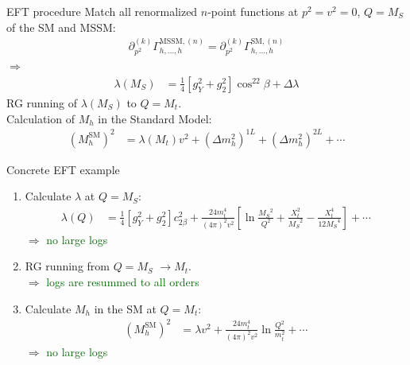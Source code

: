 \documentclass[hyperref={pdfpagelabels=false},ngerman]{beamer}
\newcommand{\MS}{\ensuremath{M_S}}
\newcommand{\SM}{\ensuremath{\text{SM}}}
\newcommand{\MSSM}{\ensuremath{\text{MSSM}}}
\begin{document}
\begin{frame}{EFT procedure}
  Match all renormalized $n$-point functions at $p^2 = v^2 = 0$, $Q =
  \MS$ of the SM and MSSM:
  \begin{align*}
    \partial_{p^2}^{(k)}\Gamma_{h,\ldots,h}^{\MSSM,(n)}
    = \partial_{p^2}^{(k)}\Gamma_{h,\ldots,h}^{\SM,(n)}
  \end{align*}
  $\Rightarrow$
  \begin{align*}
    \lambda(M_S) &= \frac{1}{4}\left[g_Y^{2} + g_2^2\right] \cos^22\beta
    + \Delta \lambda
  \end{align*}
  RG running of $\lambda(\MS)$ to $Q=M_t$.\\
  Calculation of $M_h$ in the Standard Model:
  \begin{align*}
    (M_h^\SM)^2 &= \lambda(M_t) v^2 + (\Delta m_h^2)^{1L}
    + (\Delta m_h^2)^{2L} + \cdots
  \end{align*}
\end{frame}

\begin{frame}{Concrete EFT example}
  \begin{enumerate}
  \item Calculate $\lambda$ at $Q = \MS$:
    \begin{align*}
      \lambda(Q) &= \frac{1}{4}\left[g_Y^{2} + g_2^2\right] c^2_{2\beta}
      + \frac{24 m_t^4}{(4\pi)^2 v^2} \left[
        \ln\frac{\MS^2}{Q^2} + \frac{X_t^2}{\MS^2} - \frac{X_t^4}{12 \MS^4}
      \right]
      + \cdots
    \end{align*}
    $\Rightarrow$ \textcolor{darkgreen}{no large logs}
  \item RG running from $Q = \MS$ $\rightarrow M_t$.\\
    $\Rightarrow$ \textcolor{darkgreen}{logs are resummed to all orders}
  \item Calculate $M_h$ in the SM at $Q = M_t$:
    \begin{align*}
      (M_h^\SM)^2 &= \lambda v^2 + \frac{24 m_t^4}{(4\pi)^2 v^2} \ln\frac{Q^2}{m_t^2} + \cdots
    \end{align*}
    $\Rightarrow$ \textcolor{darkgreen}{no large logs}
  \end{enumerate}
\end{frame}
\end{document}
